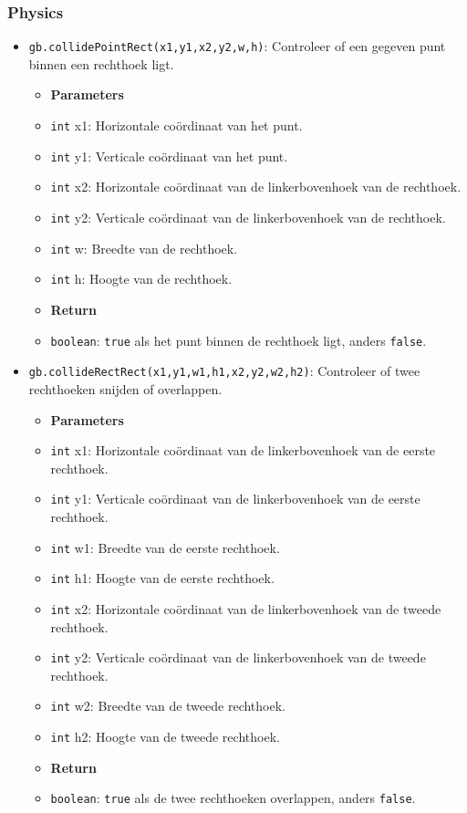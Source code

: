 \documentclass[a4paper,titlepage,12pt]{article}
\begin{document}
	\subsubsection{Physics}
	\begin{itemize}
		\item \texttt{gb.collidePointRect(x1,y1,x2,y2,w,h)}: 
		Controleer of een gegeven punt binnen een rechthoek ligt.
		\begin{itemize}
			\item [] \textbf{Parameters}
			\item \texttt{int} x1: Horizontale coördinaat van het punt.
			\item \texttt{int} y1: Verticale coördinaat van het punt.
			\item \texttt{int} x2: Horizontale coördinaat van de linkerbovenhoek van de rechthoek.
			\item \texttt{int} y2: Verticale coördinaat van de linkerbovenhoek van de rechthoek.
			\item \texttt{int} w: Breedte van de rechthoek.
			\item \texttt{int} h: Hoogte van de rechthoek.
		\end{itemize}
		\begin{itemize}
			\item [] \textbf{Return}
			\item \texttt{boolean}: \texttt{true} als het punt binnen de rechthoek ligt, anders \texttt{false}.
		\end{itemize}
	
		\samepage\item \texttt{gb.collideRectRect(x1,y1,w1,h1,x2,y2,w2,h2)}: Controleer of twee rechthoeken snijden of overlappen.
		\begin{itemize}
			\item [] \textbf{Parameters}
			\item \texttt{int} x1: Horizontale coördinaat van de linkerbovenhoek van de eerste rechthoek.
			\item \texttt{int} y1: Verticale coördinaat van de linkerbovenhoek van de eerste rechthoek.
			\item \texttt{int} w1: Breedte van de eerste rechthoek.
			\item \texttt{int} h1: Hoogte van de eerste rechthoek.
			\item \texttt{int} x2: Horizontale coördinaat van de linkerbovenhoek van de tweede rechthoek.
			\item \texttt{int} y2: Verticale coördinaat van de linkerbovenhoek van de tweede rechthoek.
			\item \texttt{int} w2: Breedte van de tweede rechthoek.
			\item \texttt{int} h2: Hoogte van de tweede rechthoek.
		\end{itemize}
		\begin{itemize}
			\item [] \textbf{Return}
			\item \texttt{boolean}: \texttt{true} als de twee rechthoeken overlappen, anders \texttt{false}.
		\end{itemize}
	

\end{itemize}
\end{document}
